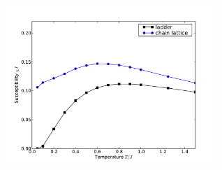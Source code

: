 \href{http://alps.comp-phys.org/vistrails/download.php?getvt=10&db=vistrails&host=alps.ethz.ch&port=3306&tag=&execute=True&showspreadsheetonly=True&version=163}{\includegraphics[width=8cm]{vistrails_images/alps.ethz.ch_vistrails_3306_10_163_pdf/None_None.pdf}
}